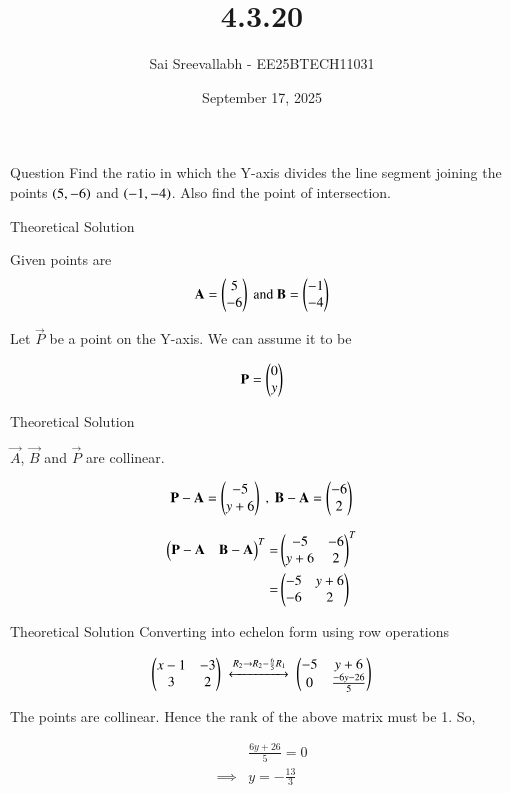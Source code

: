 \documentclass{beamer}
\title 
{4.3.20}
\date{September 17, 2025}
\author 
{Sai Sreevallabh - EE25BTECH11031}
\begin{document}
\frame{\titlepage}
\begin{frame}{Question}
Find the ratio in which the Y-axis divides the line segment joining the points $\left(5,-6\right)$ and $\left(-1,-4\right)$. Also find the point of intersection. \\
\end{frame}



\begin{frame}{Theoretical Solution}

Given points are\\
\begin{align}
    \mathbf{A}=\begin{pmatrix}5\\-6\end{pmatrix} \ \text{and}\  \mathbf{B}=\begin{pmatrix}-1\\-4\end{pmatrix}
\end{align}

Let $\vec{P}$ be a point on the Y-axis. We can assume it to be

\begin{align}
    \mathbf{P}=\begin{pmatrix}0\\y\end{pmatrix}
\end{align}

\end{frame}

\begin{frame}{Theoretical Solution}

$\vec{A}$, $\vec{B}$ and $\vec{P}$ are collinear. 

\begin{align}
    \vec{P}-\vec{A}=\myvec{-5 \\ y+6} \ , \ 
    \vec{B}-\vec{A}=\myvec{-6\\2}  
\end{align}

\begin{align}
    \begin{pmatrix}\mathbf{P}-\mathbf{A} & \mathbf{B}-\mathbf{A}\end{pmatrix}^T =& \begin{pmatrix}-5 & -6\\ y+6 & 2\end{pmatrix}^T\\
    =& \begin{pmatrix}-5 & y+6 \\ -6 & 2\end{pmatrix}
\end{align}

\end{frame}

\begin{frame}{Theoretical Solution}
Converting into echelon form using row operations

\begin{align}
    \begin{pmatrix}x-1 & -3 \\ 3 & 2\end{pmatrix}\ \xleftrightarrow[]{R_2 \to R_2-\frac{6}{5}R_1} \  \begin{pmatrix}-5 & y+6 \\ 0 & \frac{-6y-26}{5}\end{pmatrix}
\end{align}

The points are collinear. Hence the rank of the above matrix must be 1. So, 

\begin{align}
    &\frac{6y+26}{5} = 0\\
    \implies& y=-\frac{13}{3}
\end{align}\\

\end{frame}
\end{document}
